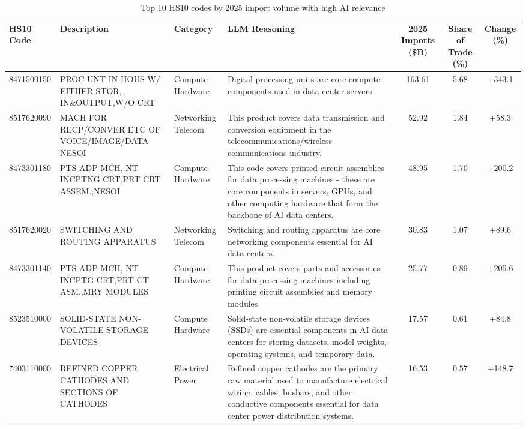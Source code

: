 \begin{landscape}
\begin{table}[htbp]
\centering
\footnotesize
\caption{Top 10 HS10 codes by 2025 import volume with high AI relevance}
\label{tab:top10_high_relevance_landscape}
\setlength{\tabcolsep}{2mm}
\renewcommand{\arraystretch}{1.0}
\begin{tabular}{lp{4cm}lp{6cm}ccc}
\toprule
HS10 Code & Description & Category & LLM Reasoning & 2025 Imports (\$B) & Share of Trade (\%) & Change (\%) \\
\midrule
8471500150 & {\scriptsize PROC UNT IN HOUS W/ EITHER STOR, IN\&OUTPUT,W/O CRT} & Compute Hardware & {\scriptsize Digital processing units are core compute components used in data center servers.} & 163.61 & 5.68 & +343.1 \\
8517620090 & {\scriptsize MACH FOR RECP/CONVER ETC OF VOICE/IMAGE/DATA NESOI} & Networking Telecom & {\scriptsize This product covers data transmission and conversion equipment in the telecommunications/wireless communications industry.} & 52.92 & 1.84 & +58.3 \\
8473301180 & {\scriptsize PTS ADP MCH, NT INCPTNG CRT,PRT CRT ASSEM.;NESOI} & Compute Hardware & {\scriptsize This code covers printed circuit assemblies for data processing machines - these are core components in servers, GPUs, and other computing hardware that form the backbone of AI data centers.} & 48.95 & 1.70 & +200.2 \\
8517620020 & {\scriptsize SWITCHING AND ROUTING APPARATUS} & Networking Telecom & {\scriptsize Switching and routing apparatus are core networking components essential for AI data centers.} & 30.83 & 1.07 & +89.6 \\
8473301140 & {\scriptsize PTS ADP MCH, NT INCPTG CRT,PRT CT ASM.,MRY MODULES} & Compute Hardware & {\scriptsize This product covers parts and accessories for data processing machines including printing circuit assemblies and memory modules.} & 25.77 & 0.89 & +205.6 \\
8523510000 & {\scriptsize SOLID-STATE NON-VOLATILE STORAGE DEVICES} & Compute Hardware & {\scriptsize Solid-state non-volatile storage devices (SSDs) are essential components in AI data centers for storing datasets, model weights, operating systems, and temporary data.} & 17.57 & 0.61 & +84.8 \\
7403110000 & {\scriptsize REFINED COPPER CATHODES AND SECTIONS OF CATHODES} & Electrical Power & {\scriptsize Refined copper cathodes are the primary raw material used to manufacture electrical wiring, cables, busbars, and other conductive components essential for data center power distribution systems.} & 16.53 & 0.57 & +148.7 \\

\end{tabular}
\end{table}
\end{landscape}

